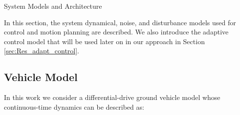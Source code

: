 \begin{section}{System Models and Architecture}
	
\label{sec:modeling}
In this section, the system dynamical, noise, and disturbance models used for control and motion planning are described. We also introduce the adaptive control model that will be used later on in our approach in Section \ref{sec:Res_adapt_control}.


\subsection{Vehicle Model}
In this work we consider a differential-drive ground vehicle model \cite{nutaro2011building} whose continuous-time dynamics can be described as:


\end{section}
